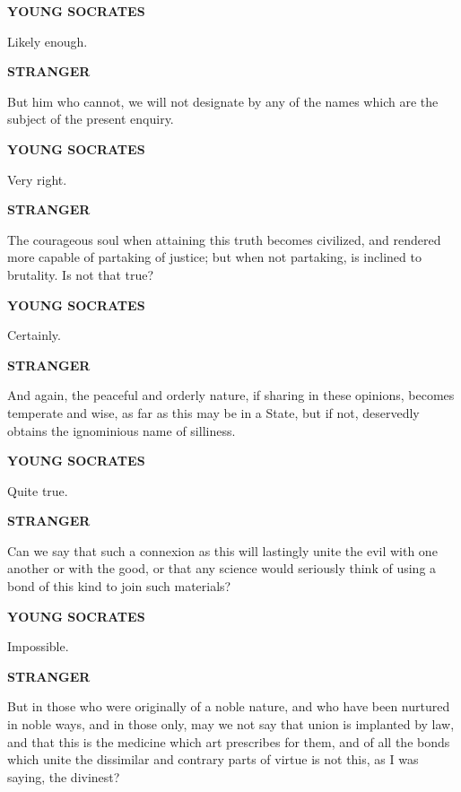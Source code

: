 \documentclass[11pt,letter]{article}
\begin{document}
\par \textbf{YOUNG SOCRATES}
\par   Likely enough.

\par \textbf{STRANGER}
\par   But him who cannot, we will not designate by any of the names which are the subject of the present enquiry.

\par \textbf{YOUNG SOCRATES}
\par   Very right.

\par \textbf{STRANGER}
\par   The courageous soul when attaining this truth becomes civilized, and rendered more capable of partaking of justice; but when not partaking, is inclined to brutality. Is not that true?

\par \textbf{YOUNG SOCRATES}
\par   Certainly.

\par \textbf{STRANGER}
\par   And again, the peaceful and orderly nature, if sharing in these opinions, becomes temperate and wise, as far as this may be in a State, but if not, deservedly obtains the ignominious name of silliness.

\par \textbf{YOUNG SOCRATES}
\par   Quite true.

\par \textbf{STRANGER}
\par   Can we say that such a connexion as this will lastingly unite the evil with one another or with the good, or that any science would seriously think of using a bond of this kind to join such materials?

\par \textbf{YOUNG SOCRATES}
\par   Impossible.

\par \textbf{STRANGER}
\par   But in those who were originally of a noble nature, and who have been nurtured in noble ways, and in those only, may we not say that union is implanted by law, and that this is the medicine which art prescribes for them, and of all the bonds which unite the dissimilar and contrary parts of virtue is not this, as I was saying, the divinest?
\end{document}
